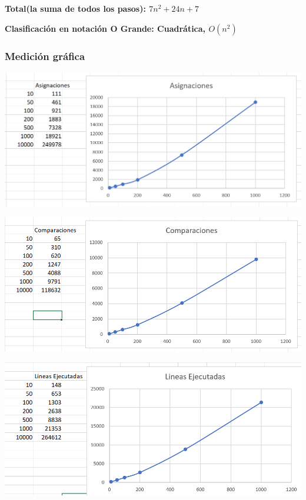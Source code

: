 \documentclass{article}
\begin{document}
\textbf{Total(la suma de todos los pasos): \(7n^{2}+24n+7\)}


\textbf{Clasificación en notación O Grande: Cuadrática, \(O(n^{2})\)}

\subsubsection{Medición gráfica}
\begin{center}
  \includegraphics[scale=1.5]{prob/graf-asig.png}
\end{center}
\begin{center}
  \includegraphics[scale=1.5]{prob/graf-comp.png}
\end{center}
\begin{center}
  \includegraphics[scale=1.5]{prob/graf-lineas.png}
\end{center}
\end{document}

